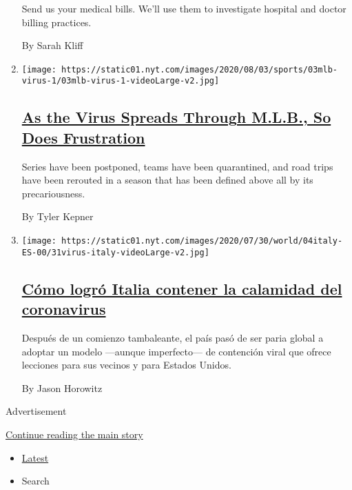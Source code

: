 \begin{enumerate}
  Send us your medical bills. We'll use them to investigate hospital and
  doctor billing practices.

  By Sarah Kliff
\item
  \texttt{[image: https://static01.nyt.com/images/2020/08/03/sports/03mlb-virus-1/03mlb-virus-1-videoLarge-v2.jpg]}

  \hypertarget{as-the-virus-spreads-through-mlb-so-does-frustration}{%
  \subsection{\texorpdfstring{\href{/2020/08/03/sports/baseball/mlb-coronavirus-outbreak.html}{As
  the Virus Spreads Through M.L.B., So Does
  Frustration}}{As the Virus Spreads Through M.L.B., So Does Frustration}}\label{as-the-virus-spreads-through-mlb-so-does-frustration}}

  Series have been postponed, teams have been quarantined, and road
  trips have been rerouted in a season that has been defined above all
  by its precariousness.

  By Tyler Kepner
\item
  \texttt{[image: https://static01.nyt.com/images/2020/07/30/world/04italy-ES-00/31virus-italy-videoLarge-v2.jpg]}

  \hypertarget{cuxf3mo-logruxf3-italia-contener-la-calamidad-del-coronavirus}{%
  \subsection{\texorpdfstring{\href{/es/2020/08/05/espanol/mundo/italia-reapertura-coronavirus.html}{Cómo
  logró Italia contener la calamidad del
  coronavirus}}{Cómo logró Italia contener la calamidad del coronavirus}}\label{cuxf3mo-logruxf3-italia-contener-la-calamidad-del-coronavirus}}

  Después de un comienzo tambaleante, el país pasó de ser paria global a
  adoptar un modelo ---aunque imperfecto--- de contención viral que
  ofrece lecciones para sus vecinos y para Estados Unidos.

  By Jason Horowitz
\end{enumerate}

Advertisement

\protect\hyperlink{after-mid2}{Continue reading the main story}

\begin{itemize}
\tightlist
\item
  \protect\hyperlink{stream-panel}{Latest}
\item
  Search
\end{itemize}

